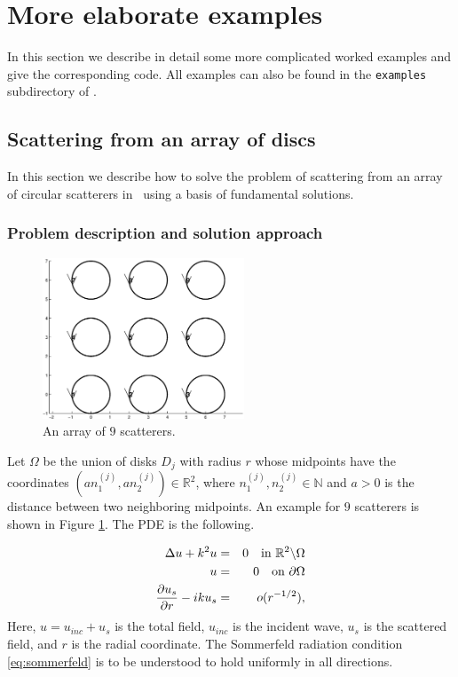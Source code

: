 \section{More elaborate examples}
\label{s:exa}

In this section we describe in detail some more complicated
worked examples and give the corresponding code.
All examples can also be found in the
{\texttt{examples}} subdirectory of \mpspack.


\subsection{Scattering from an array of discs}

In this section we describe how to solve the problem of scattering
from an array of circular scatterers in \mpspack\ using a basis of
fundamental solutions.

\subsubsection{Problem description and solution approach}

\begin{figure}
\center
\includegraphics[width=6cm]{circarray}
\caption{An array of $9$ scatterers.}
\label{fig:circarray}
\end{figure}

Let $\Omega$ be the union of disks $D_j$ with radius $r$ whose
midpoints have the coordinates $(an_1^{(j)},an_2^{(j)})\in\mathbb{R}^2$, where
$n_1^{(j)},n_2^{(j)}\in\mathbb{N}$ and $a>0$ is the distance between
two neighboring midpoints. An example for $9$ scatterers is shown in Figure
\ref{fig:circarray}. The PDE is the following.
 
\begin{eqnarray}
\Delta u+k^2u & = & 0  \quad \text{in
}\mathbb{R}^2\backslash\Omega\label{eq:helm0}\\
u&=&0 \quad \text{on } {\partial\Omega} \label{eq:soundsoft0}\\
\frac{\partial u_s}{\partial r}-iku_s & = & o(r^{-1/2}),\label{eq:sommerfeld0}
\end{eqnarray}
Here, $u=u_{inc}+u_s$ is the total field, $u_{inc}$ is the incident
wave, $u_s$ is the scattered field, and $r$ is the radial coordinate.
The Sommerfeld radiation condition
\eqref{eq:sommerfeld} is to be understood to hold uniformly in all
directions. 


